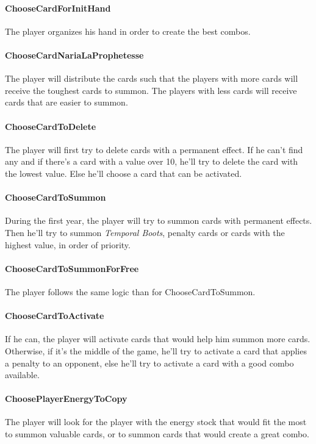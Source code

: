 \begin{appendices}
    \paragraph{ChooseCardForInitHand}
    The player organizes his hand in order to create the best combos.
    
    \paragraph{ChooseCardNariaLaProphetesse}
    The player will distribute the cards such that the players with more cards will receive the toughest cards to summon. The players with less cards will receive cards that are easier to summon.
    
    \paragraph{ChooseCardToDelete}
    The player will first try to delete cards with a permanent effect. If he can't find any and if there's a card with a value over 10, he'll try to delete the card with the lowest value. Else he'll choose a card that can be activated.
    
    \paragraph{ChooseCardToSummon}
    During the first year, the player will try to summon cards with permanent effects. Then he'll try to summon \textit{Temporal Boots}, penalty cards or cards with the highest value, in order of priority.
    
    \paragraph{ChooseCardToSummonForFree}
    The player follows the same logic than for ChooseCardToSummon.

    \paragraph{ChooseCardToActivate}
    If he can, the player will activate cards that would help him summon more cards. Otherwise, if it's the middle of the game, he'll try to activate a card that applies a penalty to an opponent, else he'll try to activate a card with a good combo available.
    
    \paragraph{ChoosePlayerEnergyToCopy}
    The player will look for the player with the energy stock that would fit the most to summon valuable cards, or to summon cards that would create a great combo.


\end{appendices}

